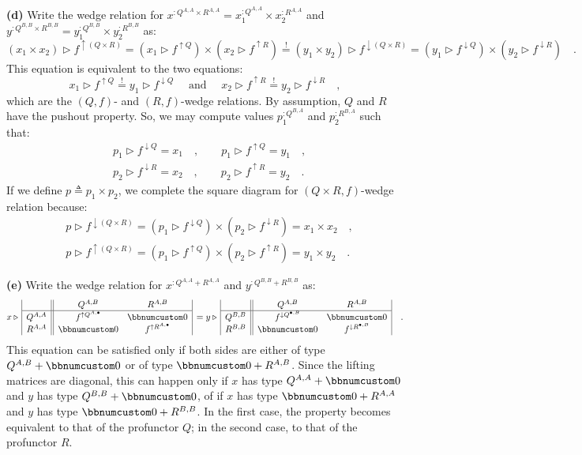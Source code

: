\textbf{(d)} Write the wedge relation for $x^{:Q^{A,A}\times R^{A,A}}=x_{1}^{:Q^{A,A}}\times x_{2}^{:R^{A,A}}$
and $y^{:Q^{B,B}\times R^{B,B}}=y_{1}^{:Q^{B,B}}\times y_{2}^{:R^{B,B}}$
as:
\[
(x_{1}\times x_{2})\triangleright f^{\uparrow(Q\times R)}=(x_{1}\triangleright f^{\uparrow Q})\times(x_{2}\triangleright f^{\uparrow R})\overset{!}{=}(y_{1}\times y_{2})\triangleright f^{\downarrow(Q\times R)}=(y_{1}\triangleright f^{\downarrow Q})\times(y_{2}\triangleright f^{\downarrow R})\quad.
\]
This equation is equivalent to the two equations:
\[
x_{1}\triangleright f^{\uparrow Q}\overset{!}{=}y_{1}\triangleright f^{\downarrow Q}\quad\text{ and }\quad x_{2}\triangleright f^{\uparrow R}\overset{!}{=}y_{2}\triangleright f^{\downarrow R}\quad,
\]
which are the $\left(Q,f\right)$- and $\left(R,f\right)$-wedge relations.
By assumption, $Q$ and $R$ have the pushout property. So, we may
compute values $p_{1}^{:Q^{B,A}}$ and $p_{2}^{:R^{B,A}}$ such that:
\begin{align*}
 & p_{1}\triangleright f^{\downarrow Q}=x_{1}\quad,\quad\quad p_{1}\triangleright f^{\uparrow Q}=y_{1}\quad,\\
 & p_{2}\triangleright f^{\downarrow R}=x_{2}\quad,\quad\quad p_{2}\triangleright f^{\uparrow R}=y_{2}\quad.
\end{align*}
If we define $p\triangleq p_{1}\times p_{2}$, we complete the square
diagram for $\left(Q\times R,f\right)$-wedge relation because:
\begin{align*}
 & p\triangleright f^{\downarrow(Q\times R)}=(p_{1}\triangleright f^{\downarrow Q})\times(p_{2}\triangleright f^{\downarrow R})=x_{1}\times x_{2}\quad,\\
 & p\triangleright f^{\uparrow(Q\times R)}=(p_{1}\triangleright f^{\uparrow Q})\times(p_{2}\triangleright f^{\uparrow R})=y_{1}\times y_{2}\quad.
\end{align*}

\textbf{(e)} Write the wedge relation for $x^{:Q^{A,A}+R^{A,A}}$
and $y^{:Q^{B,B}+R^{B,B}}$ as:
\[
x\triangleright\,\begin{array}{|c||cc|}
 & Q^{A,B} & R^{A,B}\\
\hline Q^{A,A} & f^{\uparrow Q^{A,\bullet}} & \bbnum 0\\
R^{A,A} & \bbnum 0 & f^{\uparrow R^{A,\bullet}}
\end{array}\,=y\triangleright\,\begin{array}{|c||cc|}
 & Q^{A,B} & R^{A,B}\\
\hline Q^{B,B} & f^{\downarrow Q^{\bullet,B}} & \bbnum 0\\
R^{B,B} & \bbnum 0 & f^{\downarrow R^{\bullet,B}}
\end{array}\quad.
\]
This equation can be satisfied only if both sides are either of type
$Q^{A,B}+\bbnum 0$ or of type $\bbnum 0+R^{A,B}$. Since the lifting
matrices are diagonal, this can happen only if $x$ has type $Q^{A,A}+\bbnum 0$
and $y$ has type $Q^{B,B}+\bbnum 0$, of if $x$ has type $\bbnum 0+R^{A,A}$
and $y$ has type $\bbnum 0+R^{B,B}$. In the first case, the property
becomes equivalent to that of the profunctor $Q$; in the second case,
to that of the profunctor $R$.

